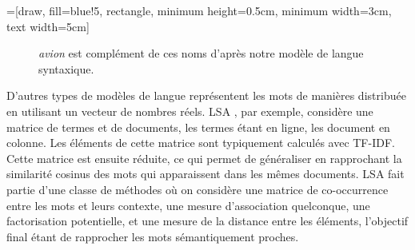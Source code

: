 =[draw, fill=blue!5, rectangle, minimum height=0.5cm, minimum width=3cm, text width=5cm]

\begin{figure}[ht]
  \centering
  \caption{\emph{avion} est complément de ces noms d'après notre modèle de langue syntaxique.}
\end{figure}

D'autres types de modèles de langue représentent les mots de manières
distribuée en utilisant un vecteur de nombres réels. LSA
\citep{deerwester1990indexing}, par exemple, considère une matrice de termes et
de documents, les termes étant en ligne, les document en colonne. Les éléments
de cette matrice sont typiquement calculés avec TF-IDF. Cette matrice est
ensuite réduite, ce qui permet de généraliser en rapprochant la similarité
cosinus des mots qui apparaissent dans les mêmes documents. LSA fait partie
d'une classe de méthodes où on considère une matrice de co-occurrence entre les
mots et leurs contexte, une mesure d'association quelconque, une factorisation
potentielle, et une mesure de la distance entre les éléments, l'objectif final
étant de rapprocher les mots sémantiquement proches.

